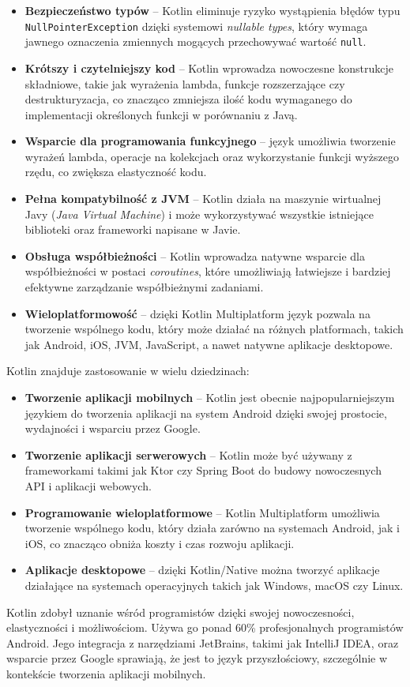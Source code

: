 \documentclass[12pt]{article}
\begin{document}
\begin{itemize}
    \item \textbf{Bezpieczeństwo typów} – Kotlin eliminuje ryzyko wystąpienia błędów typu \texttt{NullPointerException} dzięki systemowi \textit{nullable types},
	który wymaga jawnego oznaczenia zmiennych mogących przechowywać wartość \texttt{null}.
    \item \textbf{Krótszy i czytelniejszy kod} – Kotlin wprowadza nowoczesne konstrukcje składniowe, takie jak wyrażenia lambda, funkcje rozszerzające czy destrukturyzacja,
	co znacząco zmniejsza ilość kodu wymaganego do implementacji określonych funkcji w porównaniu z Javą.
    \item \textbf{Wsparcie dla programowania funkcyjnego} – język umożliwia tworzenie wyrażeń lambda, operacje na kolekcjach oraz wykorzystanie funkcji wyższego rzędu,
	co zwiększa elastyczność kodu.
    \item \textbf{Pełna kompatybilność z JVM} – Kotlin działa na maszynie wirtualnej Javy (\textit{Java Virtual Machine}) i może wykorzystywać
	wszystkie istniejące biblioteki oraz frameworki napisane w Javie.
    \item \textbf{Obsługa współbieżności} – Kotlin wprowadza natywne wsparcie dla współbieżności w postaci \textit{coroutines},
	które umożliwiają łatwiejsze i bardziej efektywne zarządzanie współbieżnymi zadaniami.
    \item \textbf{Wieloplatformowość} – dzięki Kotlin Multiplatform język pozwala na tworzenie wspólnego kodu, który może działać na różnych platformach,
	takich jak Android, iOS, JVM, JavaScript, a nawet natywne aplikacje desktopowe.
\end{itemize}
Kotlin znajduje zastosowanie w wielu dziedzinach:
\begin{itemize}
    \item \textbf{Tworzenie aplikacji mobilnych} – Kotlin jest obecnie najpopularniejszym językiem do tworzenia aplikacji na system Android dzięki swojej prostocie,
	wydajności i wsparciu przez Google.
    \item \textbf{Tworzenie aplikacji serwerowych} – Kotlin może być używany z frameworkami takimi jak Ktor czy Spring Boot do budowy nowoczesnych API i aplikacji webowych.
    \item \textbf{Programowanie wieloplatformowe} – Kotlin Multiplatform umożliwia tworzenie wspólnego kodu, który działa zarówno na systemach Android, jak i iOS,
	co znacząco obniża koszty i czas rozwoju aplikacji.
    \item \textbf{Aplikacje desktopowe} – dzięki Kotlin/Native można tworzyć aplikacje działające na systemach operacyjnych takich jak Windows, macOS czy Linux.
\end{itemize}
Kotlin zdobył uznanie wśród programistów dzięki swojej nowoczesności, elastyczności i możliwościom. Używa go ponad 60\% profesjonalnych programistów Android.
\cite{kotlin-popularność} Jego integracja z narzędziami JetBrains, takimi jak IntelliJ IDEA, oraz wsparcie przez Google sprawiają, że jest to język przyszłościowy,
szczególnie w kontekście tworzenia aplikacji mobilnych.
\end{document}
